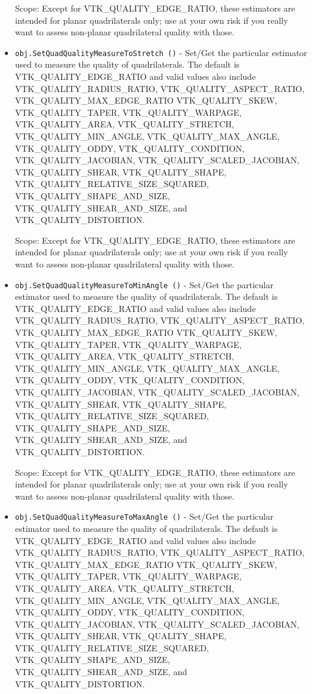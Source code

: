 \begin{itemize}
 Scope: Except for VTK\_QUALITY\_EDGE\_RATIO, these estimators are intended for planar
 quadrilaterals only; use at your own risk if you really want to assess non-planar
 quadrilateral quality with those.

\item  \verb|obj.SetQuadQualityMeasureToStretch ()| -  Set/Get the particular estimator used to measure the quality of quadrilaterals.
 The default is VTK\_QUALITY\_EDGE\_RATIO and valid values also include
 VTK\_QUALITY\_RADIUS\_RATIO, VTK\_QUALITY\_ASPECT\_RATIO, VTK\_QUALITY\_MAX\_EDGE\_RATIO
 VTK\_QUALITY\_SKEW, VTK\_QUALITY\_TAPER, VTK\_QUALITY\_WARPAGE, VTK\_QUALITY\_AREA,
 VTK\_QUALITY\_STRETCH, VTK\_QUALITY\_MIN\_ANGLE, VTK\_QUALITY\_MAX\_ANGLE,
 VTK\_QUALITY\_ODDY, VTK\_QUALITY\_CONDITION, VTK\_QUALITY\_JACOBIAN,
 VTK\_QUALITY\_SCALED\_JACOBIAN, VTK\_QUALITY\_SHEAR, VTK\_QUALITY\_SHAPE,
 VTK\_QUALITY\_RELATIVE\_SIZE\_SQUARED, VTK\_QUALITY\_SHAPE\_AND\_SIZE,
 VTK\_QUALITY\_SHEAR\_AND\_SIZE, and VTK\_QUALITY\_DISTORTION.

 Scope: Except for VTK\_QUALITY\_EDGE\_RATIO, these estimators are intended for planar
 quadrilaterals only; use at your own risk if you really want to assess non-planar
 quadrilateral quality with those.

\item  \verb|obj.SetQuadQualityMeasureToMinAngle ()| -  Set/Get the particular estimator used to measure the quality of quadrilaterals.
 The default is VTK\_QUALITY\_EDGE\_RATIO and valid values also include
 VTK\_QUALITY\_RADIUS\_RATIO, VTK\_QUALITY\_ASPECT\_RATIO, VTK\_QUALITY\_MAX\_EDGE\_RATIO
 VTK\_QUALITY\_SKEW, VTK\_QUALITY\_TAPER, VTK\_QUALITY\_WARPAGE, VTK\_QUALITY\_AREA,
 VTK\_QUALITY\_STRETCH, VTK\_QUALITY\_MIN\_ANGLE, VTK\_QUALITY\_MAX\_ANGLE,
 VTK\_QUALITY\_ODDY, VTK\_QUALITY\_CONDITION, VTK\_QUALITY\_JACOBIAN,
 VTK\_QUALITY\_SCALED\_JACOBIAN, VTK\_QUALITY\_SHEAR, VTK\_QUALITY\_SHAPE,
 VTK\_QUALITY\_RELATIVE\_SIZE\_SQUARED, VTK\_QUALITY\_SHAPE\_AND\_SIZE,
 VTK\_QUALITY\_SHEAR\_AND\_SIZE, and VTK\_QUALITY\_DISTORTION.

 Scope: Except for VTK\_QUALITY\_EDGE\_RATIO, these estimators are intended for planar
 quadrilaterals only; use at your own risk if you really want to assess non-planar
 quadrilateral quality with those.

\item  \verb|obj.SetQuadQualityMeasureToMaxAngle ()| -  Set/Get the particular estimator used to measure the quality of quadrilaterals.
 The default is VTK\_QUALITY\_EDGE\_RATIO and valid values also include
 VTK\_QUALITY\_RADIUS\_RATIO, VTK\_QUALITY\_ASPECT\_RATIO, VTK\_QUALITY\_MAX\_EDGE\_RATIO
 VTK\_QUALITY\_SKEW, VTK\_QUALITY\_TAPER, VTK\_QUALITY\_WARPAGE, VTK\_QUALITY\_AREA,
 VTK\_QUALITY\_STRETCH, VTK\_QUALITY\_MIN\_ANGLE, VTK\_QUALITY\_MAX\_ANGLE,
 VTK\_QUALITY\_ODDY, VTK\_QUALITY\_CONDITION, VTK\_QUALITY\_JACOBIAN,
 VTK\_QUALITY\_SCALED\_JACOBIAN, VTK\_QUALITY\_SHEAR, VTK\_QUALITY\_SHAPE,
 VTK\_QUALITY\_RELATIVE\_SIZE\_SQUARED, VTK\_QUALITY\_SHAPE\_AND\_SIZE,
 VTK\_QUALITY\_SHEAR\_AND\_SIZE, and VTK\_QUALITY\_DISTORTION.


\end{itemize}

